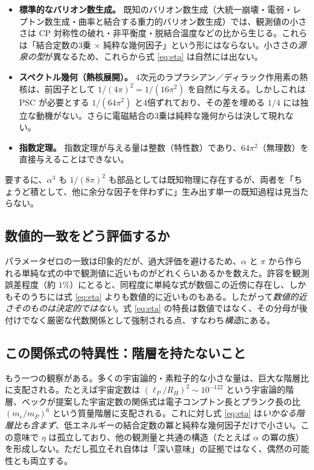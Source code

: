 \documentclass[11pt,a4paper]{article}
\newcommand{\eP}{\ell_P}
\begin{document}
\begin{itemize}[leftmargin=1.4em]
\item \textbf{標準的なバリオン数生成。} 既知のバリオン数生成（大統一崩壊・電弱・レプトン数生成・曲率と結合する重力的バリオン数生成）では、観測値の小ささは CP 対称性の破れ・非平衡度・脱結合温度などの比から生じる。これらは「結合定数の3乗 $\times$ 純粋な幾何因子」という形にはならない。小ささの\emph{源泉の型}が異なるため、これらから式 \eqref{eq:eta} は自然には出ない。
\item \textbf{スペクトル幾何（熱核展開）。} 4次元のラプラシアン／ディラック作用素の熱核は、前因子として $1/(4\pi)^2 = 1/(16\pi^2)$ を自然に与える。しかしこれは PSC が必要とする $1/(64\pi^2)$ と4倍ずれており、その差を埋める $1/4$ には独立な動機がない。さらに電磁結合の3乗は純粋な幾何からは決して現れない。
\item \textbf{指数定理。} 指数定理が与える量は整数（特性数）であり、$64\pi^2$（無理数）を直接与えることはできない。
\end{itemize}
要するに、$\alpha^3$ も $1/(8\pi)^2$ も部品としては既知物理に存在するが、両者を「ちょうど積として、他に余分な因子を伴わずに」生み出す単一の既知過程は見当たらない。

\subsection{数値的一致をどう評価するか}
パラメータゼロの一致は印象的だが、過大評価を避けるため、$\alpha$ と $\pi$ から作られる単純な式の中で観測値に近いものがどれくらいあるかを数えた。許容を観測誤差程度（約 $1\%$）にとると、同程度に単純な式が数個この近傍に存在し、しかもそのうちには式 \eqref{eq:eta} よりも数値的に近いものもある。したがって\emph{数値的近さそのものは決定的ではない}。式 \eqref{eq:eta} の特長は数値ではなく、その分母が後付けでなく厳密な代数関係として強制される点、すなわち\emph{構造}にある。

\subsection{この関係式の特異性：階層を持たないこと}
もう一つの観察がある。多くの宇宙論的・素粒子的な小さな量は、巨大な階層比に支配される。たとえば宇宙定数は $(\eP/R_H)^2\sim10^{-122}$ という宇宙論的階層、ベックが提案した宇宙定数の関係式は電子コンプトン長とプランク長の比 $(m_e/m_P)^6$ という質量階層に支配される。これに対し式 \eqref{eq:eta} は\emph{いかなる階層比も含まず}、低エネルギーの結合定数の冪と純粋な幾何因子だけで小さい。この意味で $\eta$ は孤立しており、他の観測量と共通の構造（たとえば $\alpha$ の冪の族）を形成しない。ただし孤立それ自体は「深い意味」の証拠ではなく、偶然の可能性とも両立する。
\end{document}
